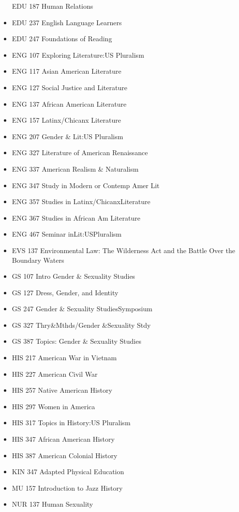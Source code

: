 \documentclass[
  letterpaper,
]{scrbook}
\begin{document}
\begin{itemize}
  EDU 187 Human Relations
\item
  EDU 237 English Language Learners
\item
  EDU 247 Foundations of Reading
\item
  ENG 107 Exploring Literature:US Pluralism
\item
  ENG 117 Asian American Literature
\item
  ENG 127 Social Justice and Literature
\item
  ENG 137 African American Literature
\item
  ENG 157 Latinx/Chicanx Literature
\item
  ENG 207 Gender \& Lit:US Pluralism
\item
  ENG 327 Literature of American Renaissance
\item
  ENG 337 American Realism \& Naturalism
\item
  ENG 347 Study in Modern or Contemp Amer Lit
\item
  ENG 357 Studies in Latinx/ChicanxLiterature
\item
  ENG 367 Studies in African Am Literature
\item
  ENG 467 Seminar inLit:USPluralism
\item
  EVS 137 Environmental Law: The Wilderness Act and the Battle Over the
  Boundary Waters
\item
  GS 107 Intro Gender \& Sexuality Studies
\item
  GS 127 Dress, Gender, and Identity
\item
  GS 247 Gender \& Sexuality StudiesSymposium
\item
  GS 327 Thry\&Mthds/Gender \&Sexuality Stdy
\item
  GS 387 Topics: Gender \& Sexuality Studies
\item
  HIS 217 American War in Vietnam
\item
  HIS 227 American Civil War
\item
  HIS 257 Native American History
\item
  HIS 297 Women in America
\item
  HIS 317 Topics in History:US Pluralism
\item
  HIS 347 African American History
\item
  HIS 387 American Colonial History
\item
  KIN 347 Adapted Physical Education
\item
  MU 157 Introduction to Jazz History
\item
  NUR 137 Human Sexuality

\end{itemize}
\end{document}
